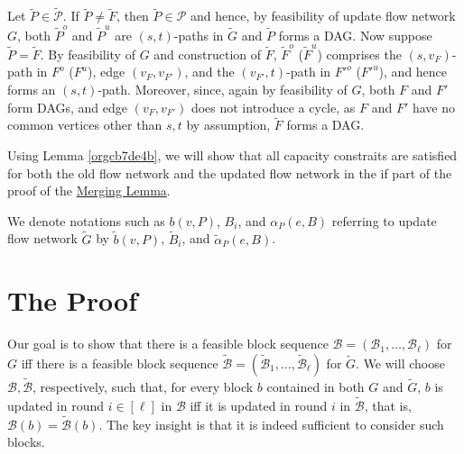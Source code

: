 \documentclass[fontsize=11pt,paper=a4]{book}
\begin{document}
Let \(\tilde{P}\in\tilde{\mathcal{P}}\).
If \(\tilde{P}\neq\tilde{F}\), then \(\tilde{P}\in\mathcal{P}\) and hence, by feasibility of update flow network \(G\), both \(\tilde{P}^o\) and \(\tilde{P}^u\) are \((s,t)\)-paths in \(\tilde{G}\) and \(\tilde{P}\) forms a DAG.
Now suppose \(\tilde{P}=\tilde{F}\).
By feasibility of \(G\) and construction of \(\tilde{F}\), \(\tilde{F}^o\) (\(\tilde{F}^u\)) comprises the \((s,v_F)\)-path in \(F^o\) (\(F^u\)), edge \((v_F,v_{F'})\), and the \((v_{F'},t)\)-path in \(F'^o\) (\(F'^u\)), and hence forms an \((s,t)\)-path.
Moreover, since, again by feasibility of \(G\), both \(F\) and \(F'\) form DAGs, and edge \((v_F,v_{F'})\) does not introduce a cycle, as \(F\) and \(F'\) have no common vertices other than \(s,t\) by assumption, \(\tilde{F}\) forms a DAG.

Using Lemma \ref{orgcb7de4b}, we will show that all capacity constraits are satisfied for both the old flow network and the updated flow network in the if part of the proof of the \hyperref[org44b4347]{Merging Lemma}.

We denote notations such as \(b(v,P)\), \(B_i\), and \(\alpha_P(e,B)\) referring to update flow network \(\tilde{G}\) by \(\tilde{b}(v,P)\), \(\tilde{B}_i\), and \(\tilde{\alpha}_P(e,B)\).

\section{The Proof}
\label{sec:org600dfbb}

Our goal is to show that there is a feasible block sequence \(\mathcal{B}=(\mathscr{B}_1,\dots,\mathscr{B}_{\ell})\) for \(G\) iff there is a feasible block sequence \(\tilde{\mathcal{B}}=(\tilde{\mathscr{B}}_1,\dots,\tilde{\mathscr{B}}_{\ell})\) for \(\tilde{G}\).
We will choose \(\mathcal{B},\tilde{\mathcal{B}}\), respectively, such that, for every block \(b\) contained in both \(G\) and \(\tilde{G}\), \(b\) is updated in round \(i\in[\ell]\) in \(\mathcal{B}\) iff it is updated in round \(i\) in \(\tilde{\mathcal{B}}\), that is, \(\mathcal{B}(b)=\tilde{\mathcal{B}}(b)\).
The key insight is that it is indeed sufficient to consider such blocks.
\end{document}
